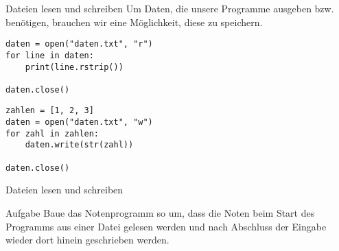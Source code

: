 \begin{frame}[fragile]{Dateien lesen und schreiben}
Um Daten, die unsere Programme ausgeben bzw. benötigen, brauchen wir eine 
Möglichkeit, diese zu speichern.
\pause{}
\begin{lstlisting}
daten = open("daten.txt", "r")
for line in daten:
    print(line.rstrip())

daten.close()
\end{lstlisting}

\pause{}

\begin{lstlisting}
zahlen = [1, 2, 3]
daten = open("daten.txt", "w")
for zahl in zahlen:
    daten.write(str(zahl))

daten.close()
\end{lstlisting}
\end{frame}

\begin{frame}[fragile]{Dateien lesen und schreiben}
\begin{block}{Aufgabe}
Baue das Notenprogramm so um, dass die Noten beim Start des Programms aus einer Datei gelesen 
werden und nach Abschluss der Eingabe wieder dort hinein geschrieben werden.
\end{block}
\end{frame}


